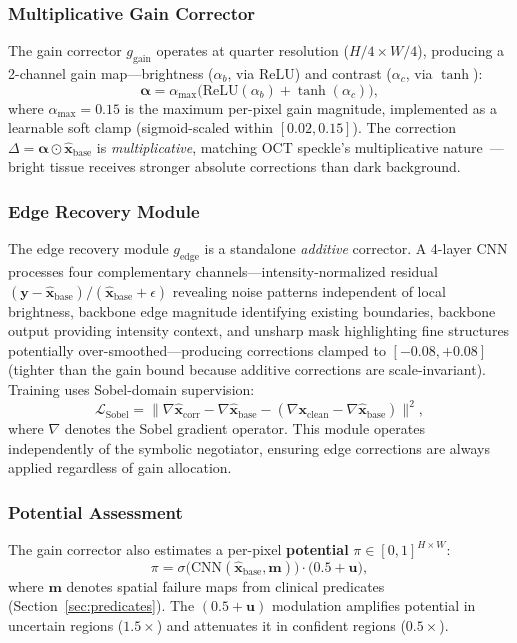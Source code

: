 \documentclass{ieeetj}
\begin{document}
\subsubsection{Multiplicative Gain Corrector}
The gain corrector $g_{\mathrm{gain}}$ operates at quarter resolution ($H/4 \times W/4$), producing a 2-channel gain map---brightness ($\alpha_b$, via ReLU) and contrast ($\alpha_c$, via $\tanh$):
\begin{equation}
\boldsymbol{\alpha} = \alpha_{\max}\!\big(\text{ReLU}(\alpha_b) + \tanh(\alpha_c)\big),
\label{eq:gain_map}
\end{equation}
where $\alpha_{\max} = 0.15$ is the maximum per-pixel gain magnitude, implemented as a learnable soft clamp (sigmoid-scaled within $[0.02, 0.15]$). The correction $\Delta = \boldsymbol{\alpha} \odot \hat{\mathbf{x}}_\text{base}$ is \emph{multiplicative}, matching OCT speckle's multiplicative nature~\cite{goodman2007speckle}---bright tissue receives stronger absolute corrections than dark background.

\subsubsection{Edge Recovery Module}
The edge recovery module $g_\text{edge}$ is a standalone \emph{additive} corrector. A 4-layer CNN processes four complementary channels---intensity-normalized residual $(\mathbf{y} - \hat{\mathbf{x}}_\text{base})/(\hat{\mathbf{x}}_\text{base} + \epsilon)$ revealing noise patterns independent of local brightness, backbone edge magnitude identifying existing boundaries, backbone output providing intensity context, and unsharp mask highlighting fine structures potentially over-smoothed---producing corrections clamped to $[-0.08, +0.08]$ (tighter than the gain bound because additive corrections are scale-invariant). Training uses Sobel-domain supervision:
\begin{equation}
\mathcal{L}_\text{Sobel} = \big\|\nabla\hat{\mathbf{x}}_\text{corr} - \nabla\hat{\mathbf{x}}_\text{base} - (\nabla\mathbf{x}_\text{clean} - \nabla\hat{\mathbf{x}}_\text{base})\big\|^2,
\label{eq:sobel_loss}
\end{equation}
where $\nabla$ denotes the Sobel gradient operator. This module operates independently of the symbolic negotiator, ensuring edge corrections are always applied regardless of gain allocation.

\subsubsection{Potential Assessment}
The gain corrector also estimates a per-pixel \textbf{potential} $\pi \in [0,1]^{H \times W}$:
\begin{equation}
\pi = \sigma\!\big(\text{CNN}(\hat{\mathbf{x}}_\text{base}, \mathbf{m})\big) \cdot \big(0.5 + \mathbf{u}\big),
\label{eq:potential}
\end{equation}
where $\mathbf{m}$ denotes spatial failure maps from clinical predicates (Section~\ref{sec:predicates}). The $(0.5 + \mathbf{u})$ modulation amplifies potential in uncertain regions ($1.5{\times}$) and attenuates it in confident regions ($0.5{\times}$).
\end{document}
